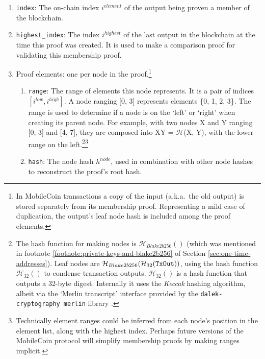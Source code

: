 \begin{enumerate}
    \item {\tt index}: The on-chain index $i^{element}$ of the output being proven a member of the blockchain.
    \item {\tt highest\_index}: The index $i^{highest}$ of the last output in the blockchain at the time this proof was created. It is used to make a comparison proof for validating this membership proof.
    \item Proof elements: one per node in the proof.\footnote{In MobileCoin transactions a copy of the input (a.k.a.\ the old output) is stored separately from its membership proof. Representing a mild case of duplication, the output's leaf node hash is included among the proof elements.}
    \begin{enumerate}
        \item {\tt range}: The range of elements this node represents. It is a pair of indices $[i^{low}, i^{high}]$. A node ranging [0, 3] represents elements \{0, 1, 2, 3\}. The range is used to determine if a node is on the `left' or `right' when creating its parent node. For example, with two nodes X and Y ranging [0, 3] and [4, 7], they are composed into XY = $\mathcal{H}$(X, Y), with the lower range on the left.\footnote{The hash function for making nodes is $\mathcal{H}_{Blake2b256}()$ (which was mentioned in footnote \ref{footnote:private-keys-and-blake2b256} of Section \ref{sec:one-time-addresses}). Leaf nodes are $\mathcal{H}_{Blake2b256}(\mathcal{H}_{32}(\textrm{\tt TxOut}))$, using the hash function $\mathcal{H}_{32}()$ to condense transaction outputs. $\mathcal{H}_{32}()$ is a hash function that outputs a 32-byte digest. Internally it uses the {\em Keccak} hashing algorithm, albeit via the `Merlin transcript' interface \cite{merlin-transcripts} provided by the {\tt dalek-cryptography merlin} library \cite{dalek-merlin-lib}.}\footnote{Technically element ranges could be inferred from each node's position in the element list, along with the highest index. Perhaps future versions of the MobileCoin protocol will simplify membership proofs by making ranges implicit.}
        \item {\tt hash}: The node hash $h^{node}$, used in combination with other node hashes to reconstruct the proof's root hash.
    \end{enumerate}
\end{enumerate}

